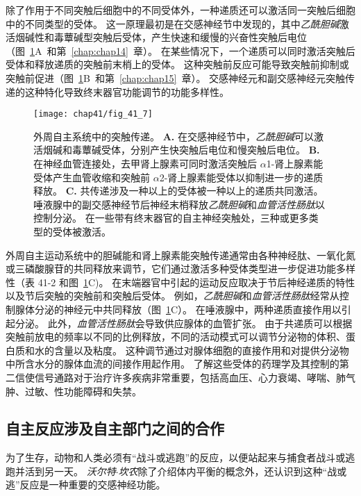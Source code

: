 除了作用于不同突触后细胞中的不同受体外，一种递质还可以激活同一突触后细胞中的不同类型的受体。
这一原理最初是在交感神经节中发现的，其中\textit{乙酰胆碱}激活烟碱性和毒蕈碱型突触后受体，产生快速和缓慢的兴奋性突触后电位（图~\ref{fig:41_7}A~和第~\ref{chap:chap14}~章）。
在某些情况下，一个递质可以同时激活突触后受体和释放递质的突触前末梢上的受体。
这种突触前反应可能导致突触前抑制或突触前促进（图~\ref{fig:41_7}B~和第~\ref{chap:chap15}~章）。
交感神经元和副交感神经元突触传递的这种特化导致终末器官功能调节的功能多样性。


\begin{figure}[htbp]
	\centering
	\texttt{[image: chap41/fig\_41\_7]}
	\caption{外周自主系统中的突触传递。
		\textbf{A.} 在交感神经节中，\textit{乙酰胆碱}可以激活烟碱和毒蕈碱受体，分别产生快突触后电位和慢突触后电位。
		\textbf{B.} 在神经血管连接处，去甲肾上腺素可同时激活突触后 $\alpha$1-肾上腺素能受体产生血管收缩和突触前 $\alpha$2-肾上腺素能受体以抑制进一步的递质释放。
		\textbf{C.} 共传递涉及一种以上的受体被一种以上的递质共同激活。
		唾液腺中的副交感神经节后神经末梢释放\textit{乙酰胆碱}和\textit{血管活性肠肽}以控制分泌。
		在一些带有终末器官的自主神经突触处，三种或更多类型的受体被激活。}
	\label{fig:41_7}
\end{figure}


外周自主运动系统中的胆碱能和肾上腺素能突触传递通常由各种神经肽、一氧化氮或三磷酸腺苷的共同释放来调节，它们通过激活多种受体类型进一步促进功能多样性（表 41-2 和图~\ref{fig:41_7}C)。
在末端器官中引起的运动反应取决于节后神经递质的特性以及节后突触的突触前和突触后受体。
例如，\textit{乙酰胆碱}和\textit{血管活性肠肽}经常从控制腺体分泌的神经元中共同释放（图~\ref{fig:41_7}C）。
在唾液腺中，两种递质直接作用以引起分泌。
此外，\textit{血管活性肠肽}会导致供应腺体的血管扩张。
由于共递质可以根据突触前放电的频率以不同的比例释放，不同的活动模式可以调节分泌物的体积、蛋白质和水的含量以及粘度。
这种调节通过对腺体细胞的直接作用和对提供分泌物中所含水分的腺体血流的间接作用起作用。
了解这些受体的药理学及其控制的第二信使信号通路对于治疗许多疾病非常重要，包括高血压、心力衰竭、哮喘、肺气肿、过敏、性功能障碍和失禁。



\subsection{自主反应涉及自主部门之间的合作}

为了生存，动物和人类必须有“战斗或逃跑”的反应，以便站起来与捕食者战斗或逃跑并活到另一天。
\textit{沃尔特$\cdot$坎农}除了介绍体内平衡的概念外，还认识到这种“战或逃”反应是一种重要的交感神经功能。


